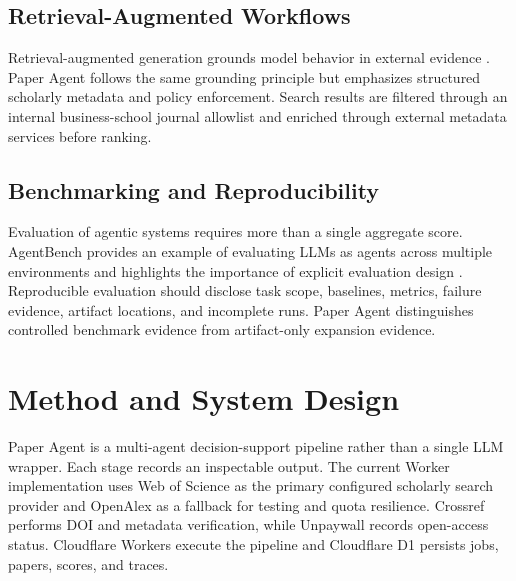 \documentclass[10pt,twocolumn]{article}
\begin{document}
\subsection{Retrieval-Augmented Workflows}
Retrieval-augmented generation grounds model behavior in external evidence \cite{lewis2020rag}. Paper Agent follows the same grounding principle but emphasizes structured scholarly metadata and policy enforcement. Search results are filtered through an internal business-school journal allowlist and enriched through external metadata services before ranking.

\subsection{Benchmarking and Reproducibility}
Evaluation of agentic systems requires more than a single aggregate score. AgentBench provides an example of evaluating LLMs as agents across multiple environments and highlights the importance of explicit evaluation design \cite{liu2023agentbench}. Reproducible evaluation should disclose task scope, baselines, metrics, failure evidence, artifact locations, and incomplete runs. Paper Agent distinguishes controlled benchmark evidence from artifact-only expansion evidence.

\section{Method and System Design}
Paper Agent is a multi-agent decision-support pipeline rather than a single LLM wrapper. Each stage records an inspectable output. The current Worker implementation uses Web of Science as the primary configured scholarly search provider and OpenAlex as a fallback for testing and quota resilience. Crossref performs DOI and metadata verification, while Unpaywall records open-access status. Cloudflare Workers execute the pipeline and Cloudflare D1 persists jobs, papers, scores, and traces.
\end{document}
